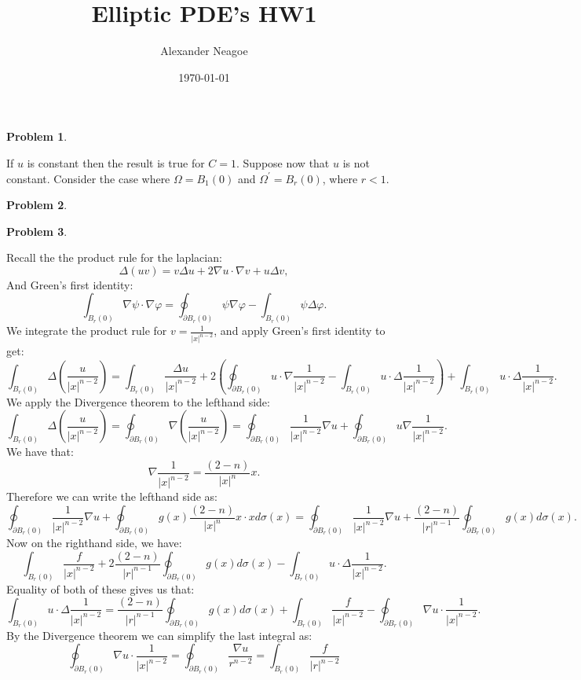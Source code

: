 \documentclass[12pt, a4paper]{article}
\title{Elliptic PDE's HW1}
\author{Alexander Neagoe }
\date{\today}
\newtheorem{problem}{Problem}
\theoremstyle{definition}
\newcommand{\bd}{\partial}
\newcommand{\grad}{\nabla}
\begin{document}
\maketitle

\begin{problem}
\end{problem}
If $u$ is constant then the result is true for $C=1$. Suppose now that $u$ is not constant. Consider the case where $\Omega  = B_1(0)$ and $\Omega^\prime = B_r(0)$, where $r<1$.  
\newpage
\begin{problem}
\end{problem}
\newpage
\begin{problem}
\end{problem}
Recall the the product rule for the laplacian: 
$$\Delta(uv) = v \Delta u + 2\grad u \cdot \grad v + u \Delta v,$$
And Green's first identity:
$$\int_{B_r(0)} \grad \psi \cdot \grad \varphi = \oint_{\bd B_r(0)} \psi \grad \varphi - \int_{B_r(0)} \psi \Delta \varphi.$$
We integrate the product rule for $v= \frac{1}{|x|^{n-2}}$, and apply Green's first identity to get:
$$\int_{B_r(0)}\Delta \left( \frac{u}{|x|^{n-2}} \right) = \int_{B_r(0)} \frac{\Delta u}{|x|^{n-2}}  + 2 \left( \oint_{\bd B_r(0)} u \cdot \grad \frac{1}{|x|^{n-2}} - \int_{B_r(0)}u \cdot \Delta \frac{1}{|x|^{n-2}}\right) + \int_{B_r(0)} u \cdot \Delta \frac{1}{|x|^{n-2}}.$$
We apply the Divergence theorem to the lefthand side: 
$$\int_{B_r(0)}\Delta \left( \frac{u}{|x|^{n-2}} \right) = \oint_{\bd B_r(0)} \grad\left(\frac{u}{|x|^{n-2}}\right) = \oint_{\bd B_r(0)} \frac{1}{|x|^{n-2}} \grad u + \oint_{\bd B_r(0)}u \grad \frac{1}{|x|^{n-2}}.$$
We have that:
$$\grad \frac{1}{|x|^{n-2}} = \frac{(2-n)}{|x|^{n}} x.$$
Therefore we can write the lefthand side as: 
$$\oint_{\bd B_r(0)} \frac{1}{|x|^{n-2}} \grad u  + \oint_{\bd B_r(0)} g(x) \frac{(2-n)}{|x|^n}x \cdot x d\sigma(x) =\oint_{\bd B_r(0)}\frac{1}{|x|^{n-2}} \grad u + \frac{(2-n)}{|r|^{n-1}} \oint_{\bd B_r(0)} g(x) d\sigma(x).$$
Now on the righthand side, we have:
$$\int_{B_r(0)} \frac{f}{|x|^{n-2}} + 2 \frac{(2-n)}{|r|^{n-1}} \oint_{\bd B_r(0)} g(x) d\sigma(x) - \int_{B_r(0)} u \cdot \Delta \frac{1}{|x|^{n-2}} .$$
Equality of both of these gives us that:
$$\int_{B_r(0)} u \cdot \Delta \frac{1}{|x|^{n-2}} = \frac{(2-n)}{|r|^{n-1}} \oint_{\bd B_r(0)} g(x) d\sigma(x) + \int_{B_r(0)} \frac{f}{|x|^{n-2}} - \oint_{\bd B_r(0)} \grad u \cdot \frac{1}{|x|^{n-2}}.$$
By the Divergence theorem we can simplify the last integral as:
$$\oint_{\bd B_r(0)} \grad u \cdot \frac{1}{|x|^{n-2}} = \oint_{\bd B_r(0)} \frac{\grad u}{r^{n-2}} = \int_{B_r(0)} \frac{f}{|r|^{n-2}} $$
\end{document}
